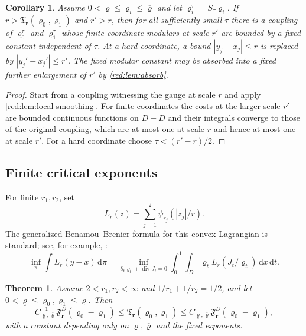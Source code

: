 \documentclass[11pt]{article}
\newtheorem{theorem}{Theorem}[section]
\newtheorem{corollary}[corollary]{Corollary}
\theoremstyle{definition}
\theoremstyle{remark}
\numberwithin{equation}{section}
\newcommand{\divv}{\operatorname{div}}
\newcommand{\dd}{\,\mathrm d}
\begin{document}
\begin{corollary}
\label{red:cor:transport-recovery}
Assume $0<\underline\varrho\le\varrho_i\le\overline\varrho$ and let $\varrho_i^\tau=S_\tau\varrho_i$.
If $r>\mathfrak T_{\boldsymbol r}(\varrho_0,\varrho_1)$ and
$r'>r$, then for all sufficiently small $\tau$ there is a coupling of
$\varrho_0^\tau$ and $\varrho_1^\tau$ whose finite-coordinate modulars at scale
$r'$ are bounded by a fixed constant independent of $\tau$.  At a hard
coordinate, a bound $|y_j-x_j|\le r$ is replaced by
$|y_j'-x_j'|\le r'$.  The fixed modular constant may be absorbed into a
fixed further enlargement of $r'$ by \cref{red:lem:absorb}.
\end{corollary}

\begin{proof}
Start from a coupling witnessing the gauge at scale $r$ and apply
\cref{red:lem:local-smoothing}.  For finite coordinates the costs at the larger
scale $r'$ are bounded continuous functions on $D-D$ and their integrals
converge to those of the original coupling, which are at most one at scale
$r$ and hence at most one at scale $r'$.  For a hard coordinate choose
$\tau<(r'-r)/2$.
\end{proof}

\subsection{Finite critical exponents}

For finite $r_1,r_2$, set
\[
 L_r(z)=\sum_{j=1}^2\psi_{r_j}(|z_j|/r).
\]
The generalized Benamou--Brenier formula for this convex Lagrangian is standard; see, for example, \cite{Santambrogio,Villani}:
\begin{equation}
 \inf_\pi\int L_r(y-x)\dd\pi
 =\inf_{\partial_t\varrho_t+\divv J_t=0}
 \int_0^1\int_D\varrho_tL_r(J_t/\varrho_t)\dd x\dd t.
 \label{red:eq:BB}
\end{equation}

\begin{theorem}
\label{red:thm:transport-flow-finite}
Assume $2<r_1,r_2<\infty$ and $1/r_1+1/r_2=1/2$, and let
$0<\underline\varrho\le\varrho_0,\varrho_1\le\overline\varrho$. Then
\begin{equation}
 C_{\underline\varrho,\overline\varrho}^{-1}\mathfrak F_{\boldsymbol r}^{D}(\varrho_0-\varrho_1)
 \le \mathfrak T_{\boldsymbol r}(\varrho_0,\varrho_1)
 \le C_{\underline\varrho,\overline\varrho}\mathfrak F_{\boldsymbol r}^{D}(\varrho_0-\varrho_1),
 \label{red:eq:finite-transport-flow}
\end{equation}
with a constant depending only on $\underline\varrho,\overline\varrho$ and the fixed exponents.
\end{theorem}
\end{document}
